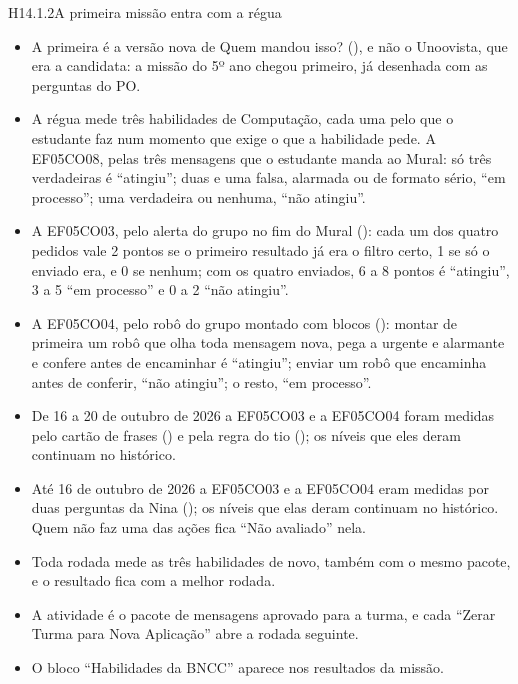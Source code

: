 \begin{historia}{H14.1.2}{A primeira missão entra com a régua}{\pronto}
\aceite
\begin{itemize}
  \item A primeira é a versão nova de Quem mandou isso? (), e não o
    Unoovista, que era a candidata: a missão do 5º ano chegou primeiro, já
    desenhada com as perguntas do PO.
  \item A régua mede três habilidades de Computação, cada uma pelo que o
    estudante faz num momento que exige o que a habilidade pede. A EF05CO08,
    pelas três mensagens que o estudante manda ao Mural: só três verdadeiras é
    \enquote{atingiu}; duas e uma falsa, alarmada ou de formato sério,
    \enquote{em processo}; uma verdadeira ou nenhuma, \enquote{não atingiu}.
  \item A EF05CO03, pelo alerta do grupo no fim do Mural ():
    cada um dos quatro pedidos vale 2 pontos se o primeiro resultado já era
    o filtro certo, 1 se só o enviado era, e 0 se nenhum; com os quatro
    enviados, 6 a 8 pontos é \enquote{atingiu}, 3 a 5 \enquote{em
    processo} e 0 a 2 \enquote{não atingiu}.
  \item A EF05CO04, pelo robô do grupo montado com blocos ():
    montar de primeira um robô que olha toda mensagem nova, pega a urgente e
    alarmante e confere antes de encaminhar é \enquote{atingiu}; enviar um
    robô que encaminha antes de conferir, \enquote{não atingiu}; o resto,
    \enquote{em processo}.
  \item De 16 a 20 de outubro de 2026 a EF05CO03 e a EF05CO04 foram medidas
    pelo cartão de frases () e pela regra do tio
    (); os níveis que eles deram continuam no histórico.
  \item Até 16 de outubro de 2026 a EF05CO03 e a EF05CO04 eram medidas por duas
    perguntas da Nina (); os níveis que elas deram continuam no
    histórico. Quem não faz uma das ações fica \enquote{Não avaliado} nela.
  \item Toda rodada mede as três habilidades de novo, também com o mesmo
    pacote, e o resultado fica com a melhor rodada.
  \item A atividade é o pacote de mensagens aprovado para a turma, e cada
    \enquote{Zerar Turma para Nova Aplicação} abre a rodada seguinte.
  \item O bloco \enquote{Habilidades da BNCC} aparece nos resultados da missão.

\end{itemize}
\end{historia}
